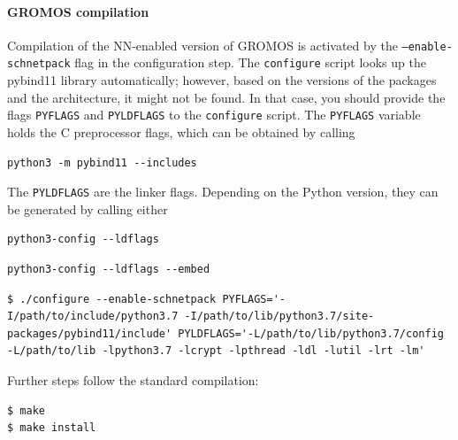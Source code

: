 \paragraph{GROMOS compilation}
Compilation of the NN-enabled version of GROMOS is activated by the \texttt{--enable-schnetpack} flag in the configuration step. The \texttt{configure} script looks up the pybind11 library automatically; however, based on the versions of the packages and the architecture, it might not be found. In that case, you should provide the flags \texttt{PYFLAGS} and \texttt{PYLDFLAGS} to the \texttt{configure} script. The \texttt{PYFLAGS} variable holds the C preprocessor flags, which can be obtained by calling

\begin{lstlisting}[breaklines=true, breakatwhitespace=false]
python3 -m pybind11 --includes
\end{lstlisting}

The \texttt{PYLDFLAGS} are the linker flags. Depending on the Python version, they can be generated by calling either 

\begin{lstlisting}[breaklines=true, breakatwhitespace=false]
python3-config --ldflags
\end{lstlisting}


\begin{lstlisting}[breaklines=true, breakatwhitespace=false]
python3-config --ldflags --embed
\end{lstlisting}

\begin{lstlisting}[breaklines=true, breakatwhitespace=false, showstringspaces=false]
$ ./configure --enable-schnetpack PYFLAGS='-I/path/to/include/python3.7 -I/path/to/lib/python3.7/site-packages/pybind11/include' PYLDFLAGS='-L/path/to/lib/python3.7/config -L/path/to/lib -lpython3.7 -lcrypt -lpthread -ldl -lutil -lrt -lm'
\end{lstlisting}

Further steps follow the standard compilation:
\begin{lstlisting}[breaklines=true, breakatwhitespace=false]
$ make
$ make install
\end{lstlisting}


